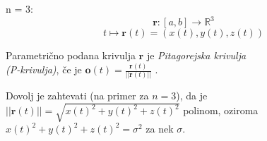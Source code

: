 \documentclass[mat1]{fmfdelo}
\newcommand{\R}{\mathbb R}
\newcommand{\rr}{\boldsymbol r}
\begin{document}
\begin{primer}
n = 3:
\begin{equation*}
\rr:[a,b] \rightarrow \R^3
\end{equation*}
\begin{equation*}
t \longmapsto \rr(t) = (x(t),y(t),z(t))
\end{equation*}
\end{primer}
\begin{definicija}
Parametrično podana krivulja $\rr$ je \textit{Pitagorejska krivulja\\ (P-krivulja)}, če je $\boldsymbol{o}(t) = \frac{\rr(t)}{||\rr(t)||}$ .
\end{definicija}
\begin{opomba}
Dovolj je zahtevati (na primer za $n = 3$), da je\\ $||\rr(t)|| = \sqrt{x(t)^2 + y(t)^2 + z(t)^2}$ polinom, oziroma $x(t)^2 + y(t)^2 + z(t)^2 = \sigma^2$ za nek $\sigma$.
\end{opomba}


\end{document}
